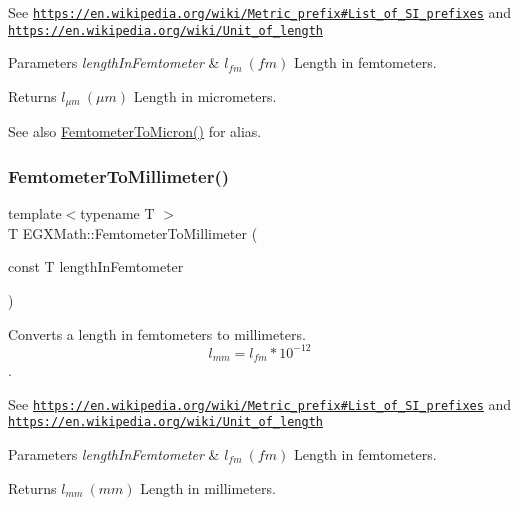 See \href{https://en.wikipedia.org/wiki/Metric_prefix#List_of_SI_prefixes}{\tt https\+://en.\+wikipedia.\+org/wiki/\+Metric\+\_\+prefix\#\+List\+\_\+of\+\_\+\+S\+I\+\_\+prefixes} and \href{https://en.wikipedia.org/wiki/Unit_of_length}{\tt https\+://en.\+wikipedia.\+org/wiki/\+Unit\+\_\+of\+\_\+length} 
\begin{DoxyParams}{Parameters}
{\em length\+In\+Femtometer} & $ l_{fm}\ (fm)$ Length in femtometers. \\
\hline
\end{DoxyParams}
\begin{DoxyReturn}{Returns}
$ l_{\mu m}\ (\mu m)$ Length in micrometers. 
\end{DoxyReturn}
\begin{DoxySeeAlso}{See also}
\mbox{\hyperlink{group___e_g_x_math-_conversions-_length_conversions-_s_i-_femtometer-_non-_s_i_gac1a358bdb9bf33dec3cb847cafe1bc71}{Femtometer\+To\+Micron()}} for alias. 
\end{DoxySeeAlso}
\mbox{\label{group___e_g_x_math-_conversions-_length_conversions-_s_i-_femtometer-_s_i_ga2e6d6c0aad4502554b05f677ff248bc8}} 
\subsubsection{\texorpdfstring{Femtometer\+To\+Millimeter()}{FemtometerToMillimeter()}}
{\footnotesize\ttfamily template$<$typename T $>$ \\
T E\+G\+X\+Math\+::\+Femtometer\+To\+Millimeter (\begin{DoxyParamCaption}\item[{const T}]{length\+In\+Femtometer }\end{DoxyParamCaption})}



Converts a length in femtometers to millimeters. \[ l_{mm}=l_{fm} * 10^{-12} \]. 

See \href{https://en.wikipedia.org/wiki/Metric_prefix#List_of_SI_prefixes}{\tt https\+://en.\+wikipedia.\+org/wiki/\+Metric\+\_\+prefix\#\+List\+\_\+of\+\_\+\+S\+I\+\_\+prefixes} and \href{https://en.wikipedia.org/wiki/Unit_of_length}{\tt https\+://en.\+wikipedia.\+org/wiki/\+Unit\+\_\+of\+\_\+length} 
\begin{DoxyParams}{Parameters}
{\em length\+In\+Femtometer} & $ l_{fm}\ (fm)$ Length in femtometers. \\
\hline
\end{DoxyParams}
\begin{DoxyReturn}{Returns}
$ l_{mm}\ (mm)$ Length in millimeters. 
\end{DoxyReturn}
\mbox{\label{group___e_g_x_math-_conversions-_length_conversions-_s_i-_femtometer-_s_i_ga61aa82ad734717567c959f0d4e840076}} 
